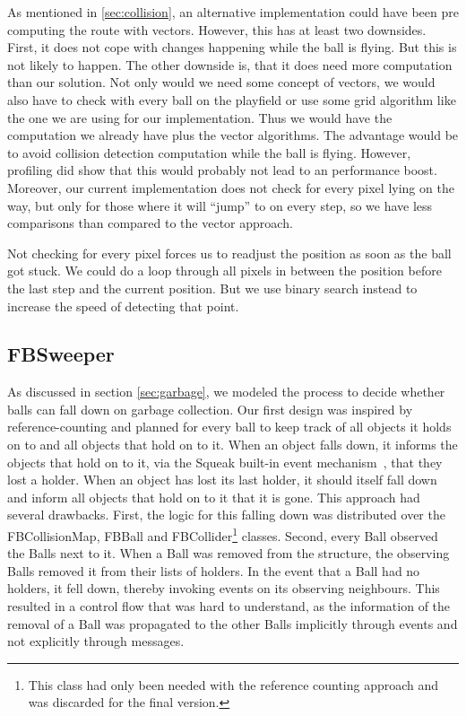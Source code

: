 As mentioned in \ref{sec:collision}, an alternative implementation could have been pre computing the route
with vectors. However, this has at least two downsides. First, it does not cope with changes happening
while the ball is flying. But this is not likely to happen. The other downside is, that it does need more
computation than our solution. Not only would we need some concept of vectors, we would also have to check
with every ball on the playfield or use some grid algorithm like the one we are using for our implementation.
Thus we would have the computation we already have plus the vector algorithms. The advantage would be to avoid
collision detection computation while the ball is flying. However, profiling did show that this would probably
not lead to an performance boost. Moreover, our current implementation does not check for every pixel lying
on the way, but only for those where it will ``jump'' to on every step, so we have less comparisons than compared
to the vector approach.

Not checking for every pixel forces us to readjust the position as soon as the ball got stuck. We could do a loop
through all pixels in between the position before the last step and the current position. But we use binary search
instead to increase the speed of detecting that point.
%
\subsection{FBSweeper}
As discussed in section \ref{sec:garbage}, we modeled the process to decide whether balls can fall down on garbage collection. Our first design was inspired by reference-counting and planned for every ball to keep track of all objects it holds on to and all objects that hold on to it. When an object falls down, it informs the objects that hold on to it, via the Squeak built-in event mechanism~\cite{website:squeakwikiObserver}, that they lost a holder. When an object has lost its last holder, it should itself fall down and inform all objects that hold on to it that it is gone.
This approach had several drawbacks. First, the logic for this falling down was distributed over the FBCollisionMap, FBBall and FBCollider\footnote{This class had only been needed with the reference counting approach and was discarded for the final version.} classes.
Second, every Ball observed the Balls next to it. When a Ball was removed from the structure, the observing Balls removed it from their lists of holders. In the event that a Ball had no holders, it fell down, thereby invoking events on its observing neighbours.
This resulted in a control flow that was hard to understand, as the information of the removal of a Ball was propagated to the other Balls implicitly through events and not explicitly through messages.

